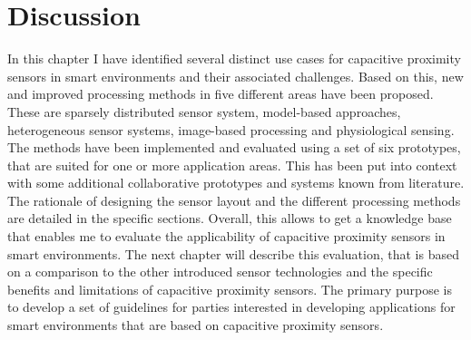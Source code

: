 
\clearpage

\clearpage

\clearpage

\clearpage

\clearpage

\clearpage

\clearpage


\section{Discussion}
In this chapter I have identified several distinct use cases for capacitive proximity sensors in smart environments and their associated challenges. Based on this, new and improved processing methods in five different areas have been proposed. These are sparsely distributed sensor system, model-based approaches, heterogeneous sensor systems, image-based processing and physiological sensing. The methods have been implemented and evaluated using a set of six prototypes, that are suited for one or more application areas. This has been put into context with some additional collaborative prototypes and systems known from literature. The rationale of designing the sensor layout and the different processing methods are detailed in the specific sections. Overall, this allows to get a knowledge base that enables me to evaluate the applicability of capacitive proximity sensors in smart environments. The next chapter will describe this evaluation, that is based on a comparison to the other introduced sensor technologies and the specific benefits and limitations of capacitive proximity sensors. The primary purpose is to develop a set of guidelines for parties interested in developing applications for smart environments that are based on capacitive proximity sensors.